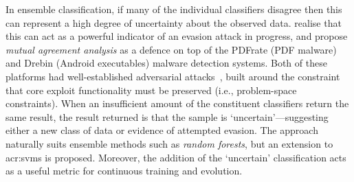 
In ensemble classification, if many of the individual classifiers disagree then this can represent a high degree of uncertainty about the observed data.
\textcite{DBLP:conf/ndss/SmutzS16} realise that this can act as a powerful indicator of an evasion attack in progress, and propose \emph{mutual agreement analysis} as a defence on top of the PDFrate (PDF malware) and Drebin (Android executables) malware detection systems.
Both of these platforms had well-established adversarial attacks~\parencite{DBLP:conf/ccs/MaiorcaCG13,DBLP:conf/sp/SrndicL14}, built around the constraint that core exploit functionality must be preserved (i.e., problem-space constraints).
When an insufficient amount of the constituent classifiers return the same result, the result returned is that the sample is `uncertain'---suggesting either a new class of data or evidence of attempted evasion.
The approach naturally suits ensemble methods such as \emph{random forests}, but an extension to \glspl{acr:svm} is proposed.
Moreover, the addition of the `uncertain' classification acts as a useful metric for continuous training and evolution.

